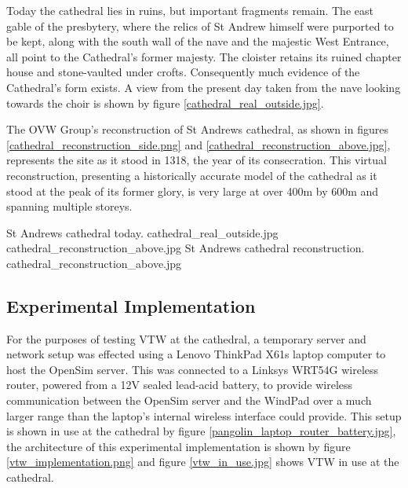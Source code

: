 Today the cathedral lies in ruins, but important fragments remain. The east gable of the presbytery, where the relics of St Andrew himself were purported to be kept, along with the south wall of the nave and the majestic West Entrance, all point to the Cathedral's former majesty. The cloister retains its ruined chapter house and stone-vaulted under crofts. Consequently much evidence of the Cathedral's form exists. A view from the present day taken from the nave looking towards the choir is shown by figure \ref{cathedral_real_outside.jpg}.


The OVW Group's reconstruction of St Andrews cathedral, as shown in figures \ref{cathedral_reconstruction_side.png} and \ref{cathedral_reconstruction_above.jpg}, represents the site as it stood in 1318, the year of its consecration. This virtual reconstruction, presenting a historically accurate model of the cathedral as it stood at the peak of its former glory, is very large at over 400m by 600m and spanning multiple storeys.

 {St Andrews cathedral today.} {cathedral_real_outside.jpg}
       {cathedral_reconstruction_above.jpg} {St Andrews cathedral reconstruction.} {cathedral_reconstruction_above.jpg}


\subsection{Experimental Implementation}




For the purposes of testing VTW at the cathedral, a temporary server and network setup was effected using a Lenovo ThinkPad X61s\thinkpadFootnote{} laptop computer to host the OpenSim server. This was connected to a Linksys WRT54G\wrtFootnote{} wireless router, powered from a 12V sealed lead-acid battery, to provide wireless communication between the OpenSim server and the WindPad over a much larger range than the laptop's internal wireless interface could provide. This setup is shown in use at the cathedral by figure \ref{pangolin_laptop_router_battery.jpg}, the architecture of this experimental implementation is shown by figure \ref{vtw_implementation.png} and figure \ref{vtw_in_use.jpg} shows VTW in use at the cathedral.


